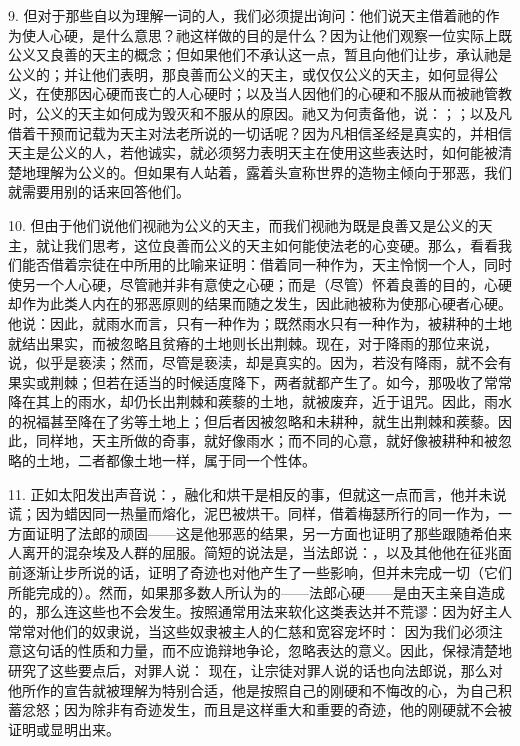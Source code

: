 9. 但对于那些自以为理解一词的人，我们必须提出询问：他们说天主借着祂的作为使人心硬，是什么意思？祂这样做的目的是什么？因为让他们观察一位实际上既公义又良善的天主的概念；但如果他们不承认这一点，暂且向他们让步，承认祂是公义的；并让他们表明，那良善而公义的天主，或仅仅公义的天主，如何显得公义，在使那因心硬而丧亡的人心硬时；以及当人因他们的心硬和不服从而被祂管教时，公义的天主如何成为毁灭和不服从的原因。祂又为何责备他，说：；；以及凡借着干预而记载为天主对法老所说的一切话呢？因为凡相信圣经是真实的，并相信天主是公义的人，若他诚实，就必须努力表明天主在使用这些表达时，如何能被清楚地理解为公义的。但如果有人站着，露着头宣称世界的造物主倾向于邪恶，我们就需要用别的话来回答他们。\par

10. 但由于他们说他们视祂为公义的天主，而我们视祂为既是良善又是公义的天主，就让我们思考，这位良善而公义的天主如何能使法老的心变硬。那么，看看我们能否借着宗徒在中所用的比喻来证明：借着同一种作为，天主怜悯一个人，同时使另一个人心硬，尽管祂并非有意使之心硬；而是（尽管）怀着良善的目的，心硬却作为此类人内在的邪恶原则的结果而随之发生，因此祂被称为使那心硬者心硬。他说：因此，就雨水而言，只有一种作为；既然雨水只有一种作为，被耕种的土地就结出果实，而被忽略且贫瘠的土地则长出荆棘。现在，对于降雨的那位来说，说，似乎是亵渎；然而，尽管是亵渎，却是真实的。因为，若没有降雨，就不会有果实或荆棘；但若在适当的时候适度降下，两者就都产生了。如今，那吸收了常常降在其上的雨水，却仍长出荆棘和蒺藜的土地，就被废弃，近于诅咒。因此，雨水的祝福甚至降在了劣等土地上；但后者因被忽略和未耕种，就生出荆棘和蒺藜。因此，同样地，天主所做的奇事，就好像雨水；而不同的心意，就好像被耕种和被忽略的土地，二者都像土地一样，属于同一个性体。\par

11. 正如太阳发出声音说：，融化和烘干是相反的事，但就这一点而言，他并未说谎；因为蜡因同一热量而熔化，泥巴被烘干。同样，借着梅瑟所行的同一作为，一方面证明了法郎的顽固——这是他邪恶的结果，另一方面也证明了那些跟随希伯来人离开的混杂埃及人群的屈服。简短的说法是，当法郎说：，以及其他他在征兆面前逐渐让步所说的话，证明了奇迹也对他产生了一些影响，但并未完成一切（它们所能完成的）。然而，如果那多数人所认为的——法郎心硬——是由天主亲自造成的，那么连这些也不会发生。按照通常用法来软化这类表达并不荒谬：因为好主人常常对他们的奴隶说，当这些奴隶被主人的仁慈和宽容宠坏时： 因为我们必须注意这句话的性质和力量，而不应诡辩地争论，忽略表达的意义。因此，保禄清楚地研究了这些要点后，对罪人说： 现在，让宗徒对罪人说的话也向法郎说，那么对他所作的宣告就被理解为特别合适，他是按照自己的刚硬和不悔改的心，为自己积蓄忿怒；因为除非有奇迹发生，而且是这样重大和重要的奇迹，他的刚硬就不会被证明或显明出来。\par

